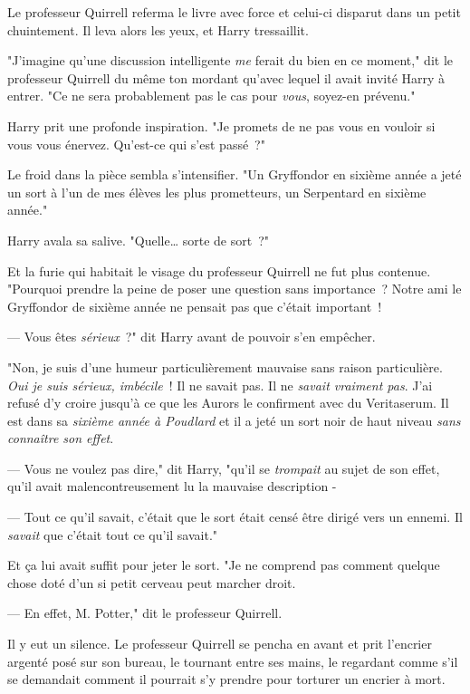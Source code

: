 Le professeur Quirrell referma le livre avec force et celui-ci disparut dans un petit chuintement. Il leva alors les yeux, et Harry tressaillit.

"J'imagine qu'une discussion intelligente \emph{me} ferait du bien en ce moment," dit le professeur Quirrell du même ton mordant qu'avec lequel il avait invité Harry à entrer. "Ce ne sera probablement pas le cas pour \emph{vous}, soyez-en prévenu."

Harry prit une profonde inspiration. "Je promets de ne pas vous en vouloir si vous vous énervez. Qu'est-ce qui s'est passé~?"

Le froid dans la pièce sembla s'intensifier. "Un Gryffondor en sixième année a jeté un sort à l'un de mes élèves les plus prometteurs, un Serpentard en sixième année."

Harry avala sa salive. "Quelle… sorte de sort~?"

Et la furie qui habitait le visage du professeur Quirrell ne fut plus contenue. "Pourquoi prendre la peine de poser une question sans importance~? Notre ami le Gryffondor de sixième année ne pensait pas que c'était important~!

--- Vous êtes \emph{sérieux}~?" dit Harry avant de pouvoir s'en empêcher.

"Non, je suis d'une humeur particulièrement mauvaise sans raison particulière. \emph{Oui je suis sérieux, imbécile}~! Il ne savait pas. Il ne \emph{savait vraiment pas}. J'ai refusé d'y croire jusqu'à ce que les Aurors le confirment avec du Veritaserum. Il est dans sa \emph{sixième année à Poudlard} et il a jeté un sort noir de haut niveau \emph{sans connaître son effet}.

--- Vous ne voulez pas dire," dit Harry, "qu'il se \emph{trompait} au sujet de son effet, qu'il avait malencontreusement lu la mauvaise description -

--- Tout ce qu'il savait, c'était que le sort était censé être dirigé vers un ennemi. Il \emph{savait} que c'était tout ce qu'il savait."

Et ça lui avait suffit pour jeter le sort. "Je ne comprend pas comment quelque chose doté d'un si petit cerveau peut marcher droit.

--- En effet, M. Potter," dit le professeur Quirrell.

Il y eut un silence. Le professeur Quirrell se pencha en avant et prit l'encrier argenté posé sur son bureau, le tournant entre ses mains, le regardant comme s'il se demandait comment il pourrait s'y prendre pour torturer un encrier à mort.

